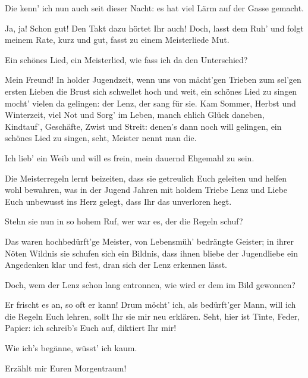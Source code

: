 \begin{drama}
\Waltherspeaks


Die kenn' ich nun auch seit dieser Nacht:
es hat viel Lärm auf der Gasse gemacht.

\Sachsspeaks


Ja, ja! Schon gut! Den Takt dazu
hörtet Ihr auch! Doch, lasst dem Ruh'
und folgt meinem Rate, kurz und gut,
fasst zu einem Meisterliede Mut.

\Waltherspeaks
Ein schönes Lied, ein Meisterlied,
wie fass ich da den Unterschied?

\Sachsspeaks


Mein Freund! In holder Jugendzeit,
wenn uns von mächt'gen Trieben
zum sel'gen ersten Lieben
die Brust sich schwellet hoch und weit,
ein schönes Lied zu singen
mocht' vielen da gelingen:
der Lenz, der sang für sie.
Kam Sommer, Herbst und Winterzeit,
viel Not und Sorg' im Leben,
manch ehlich Glück daneben,
Kindtauf', Geschäfte, Zwist und Streit:
denen's dann noch will gelingen,
ein schönes Lied zu singen,
seht, Meister nennt man die.

\Waltherspeaks
Ich lieb' ein Weib und will es frein,
mein dauernd Ehgemahl zu sein.

\Sachsspeaks
Die Meisterregeln lernt beizeiten,
dass sie getreulich Euch geleiten
und helfen wohl bewahren,
was in der Jugend Jahren
mit holdem Triebe Lenz und Liebe
Euch unbewusst ins Herz gelegt,
dass Ihr das unverloren hegt.

\Waltherspeaks
Stehn sie nun in so hohem Ruf,
wer war es, der die Regeln schuf?

\Sachsspeaks
Das waren hochbedürft'ge Meister,
von Lebensmüh' bedrängte Geister;
in ihrer Nöten Wildnis
sie schufen sich ein Bildnis,
dass ihnen bliebe der Jugendliebe
ein Angedenken klar und fest,
dran sich der Lenz erkennen lässt.

\Waltherspeaks
Doch, wem der Lenz schon lang entronnen,
wie wird er dem im Bild gewonnen?

\Sachsspeaks
Er frischt es an, so oft er kann!
Drum möcht' ich, als bedürft'ger Mann,
will ich die Regeln Euch lehren,
sollt Ihr sie mir neu erklären.
Seht, hier ist Tinte, Feder, Papier:
ich schreib's Euch auf, diktiert Ihr mir!

\Waltherspeaks
Wie ich's begänne, wüsst' ich kaum.

\Sachsspeaks
Erzählt mir Euren Morgentraum!


\end{drama}
